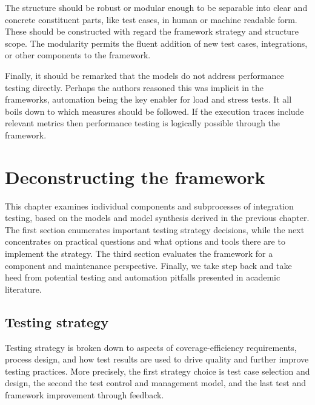 \documentclass[12pt,a4paper,oneside,pdftex]{report}
\begin{document}
The structure should be robust or modular enough to be separable into clear and concrete constituent parts, like test cases, in human or machine readable form. These should be constructed with regard the framework strategy and structure scope. The modularity permits the fluent addition of new test cases, integrations, or other components to the framework.

Finally, it should be remarked that the models do not address performance testing directly. Perhaps the authors reasoned this was implicit in the frameworks, automation being the key enabler for load and stress tests. It all boils down to which measures should be followed. If the execution traces include relevant metrics then performance testing is logically possible through the framework.

\begin{comment}
The testing process can vary in its mode of execution or degree of automation. In what is perhaps the most extreme case, test case are run automatically every time a change is committed to system source code. This approach is called continuous integration (CI). 
\end{comment}


\chapter{Deconstructing the framework}
\label{chapter:frameworkanalysis}

This chapter examines individual components and subprocesses of integration testing, based on the models and model synthesis derived in the previous chapter. The first section enumerates important testing strategy decisions, while the next concentrates on practical questions and what options and tools there are to implement the strategy. The third section evaluates the framework for a component and maintenance perspective. Finally, we take step back and take heed from potential testing and automation pitfalls presented in academic literature. 

\section{Testing strategy}

Testing strategy is broken down to aspects of coverage-efficiency requirements, process design, and how test results are used to drive quality and further improve testing practices. More precisely, the first strategy choice is test case selection and design, the second the test control and management model, and the last test and framework improvement through feedback.
\end{document}
